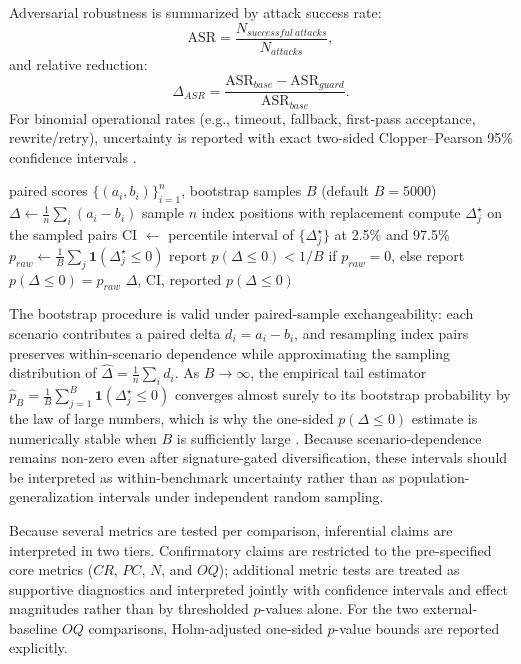 ﻿\documentclass[a4paper,12pt]{article}
\newcommand{\ind}{\mathbf{1}}
\newcommand{\BootstrapSamples}{5000}
\begin{document}
Adversarial robustness is summarized by attack success rate:
\begin{equation}
\mathrm{ASR}=\frac{N_{successful\ attacks}}{N_{attacks}},
\end{equation}
and relative reduction:
\begin{equation}
\Delta_{ASR}= \frac{\mathrm{ASR}_{base}-\mathrm{ASR}_{guard}}{\mathrm{ASR}_{base}}.
\end{equation}
For binomial operational rates (e.g., timeout, fallback, first-pass acceptance, rewrite/retry), uncertainty is reported with exact two-sided Clopper--Pearson 95\% confidence intervals \cite{Clopper1934Binomial}.

\begin{algorithm}[H]
\caption{Paired bootstrap significance}
\begin{algorithmic}[1]
\Require paired scores \(\{(a_i,b_i)\}_{i=1}^{n}\), bootstrap samples \(B\) (default \(B=\BootstrapSamples\))
\State \(\Delta \gets \frac{1}{n}\sum_i(a_i-b_i)\)
\State sample \(n\) index positions with replacement
\State compute \(\Delta_j^\star\) on the sampled pairs
\EndFor
\State CI \(\gets\) percentile interval of \(\{\Delta_j^\star\}\) at 2.5\% and 97.5\%
\State \(p_{raw}\gets \frac{1}{B}\sum_j \ind(\Delta_j^\star\le0)\)
\State report \(p(\Delta\le0)<1/B\) if \(p_{raw}=0\), else report \(p(\Delta\le0)=p_{raw}\)
\State \Return \(\Delta\), CI, reported \(p(\Delta\le0)\)
\end{algorithmic}
\end{algorithm}

The bootstrap procedure is valid under paired-sample exchangeability: each scenario contributes a paired delta \(d_i=a_i-b_i\), and resampling index pairs preserves within-scenario dependence while approximating the sampling distribution of \(\hat{\Delta}=\frac{1}{n}\sum_i d_i\). As \(B\to\infty\), the empirical tail estimator
\(\hat{p}_B=\frac{1}{B}\sum_{j=1}^{B}\ind(\Delta_j^\star\le0)\)
converges almost surely to its bootstrap probability by the law of large numbers, which is why the one-sided \(p(\Delta\le0)\) estimate is numerically stable when \(B\) is sufficiently large \cite{Efron1979Bootstrap}.
Because scenario-dependence remains non-zero even after signature-gated diversification, these intervals should be interpreted as within-benchmark uncertainty rather than as population-generalization intervals under independent random sampling.

Because several metrics are tested per comparison, inferential claims are interpreted in two tiers. Confirmatory claims are restricted to the pre-specified core metrics (\(CR\), \(PC\), \(N\), and \(OQ\)); additional metric tests are treated as supportive diagnostics and interpreted jointly with confidence intervals and effect magnitudes rather than by thresholded \(p\)-values alone. For the two external-baseline \(OQ\) comparisons, Holm-adjusted one-sided \(p\)-value bounds are reported explicitly.
\end{document}
